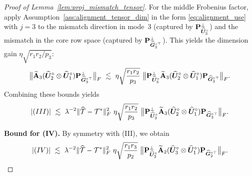 \documentclass[authoryear,preprint,review,12pt]{elsarticle}
\begin{document}
{\begin{proof}[Proof of Lemma~\ref{lem:proj_mismatch_tensor}]
		For the middle Frobenius factor, apply Assumption~\ref{ass:alignment_tensor_dim} in the form \eqref{eq:alignment_use} with $j=3$ to the mismatch direction in mode~3 (captured by
		$\mathbf{P}_{\widehat{\boldsymbol U}_3^\circ}^{\perp}$) and the mismatch in the core row space (captured by
		$\mathbf{P}_{\widehat{\boldsymbol G}_3^{\circ\top}}^{\perp}$). This yields the dimension gain $\eta\sqrt{r_1r_2/p_3}$:
		\begin{equation}\label{eq:III_mid_gain}
			\big\|\widetilde{\mathbf{A}}_3(\widehat{\boldsymbol U}_2^\circ\otimes\widehat{\boldsymbol U}_1^\circ)\mathbf{P}_{\widehat{\boldsymbol G}_3^{\circ\top}}^{\perp}\big\|_F
			\ \lesssim\
			\eta\sqrt{\frac{r_1r_2}{p_3}}\
			\big\|\mathbf{P}_{\widehat{\boldsymbol U}_3^\circ}^{\perp}\widetilde{\mathbf{A}}_3(\widehat{\boldsymbol U}_2^\circ\otimes\widehat{\boldsymbol U}_1^\circ)\mathbf{P}_{\widehat{\boldsymbol G}_3^{\circ\top}}\big\|_F.
		\end{equation}
		Combining these bounds yields
		\begin{equation}\label{eq:III_bound}
			|(III)|
			\ \lesssim\
			\lambda^{-2}\|\widehat{\mathcal{T}}-\mathcal{T}^\ast\|_F^2\
			\eta\sqrt{\frac{r_1r_2}{p_3}}\
			\big\|\mathbf{P}_{\widehat{\boldsymbol U}_3^\circ}^{\perp}\widetilde{\mathbf{A}}_3(\widehat{\boldsymbol U}_2^\circ\otimes\widehat{\boldsymbol U}_1^\circ)\mathbf{P}_{\widehat{\boldsymbol G}_3^{\circ\top}}\big\|_F.
		\end{equation}
		
		\smallskip
		\noindent\textbf{Bound for (IV).}
		By symmetry with (III), we obtain
		\begin{equation}\label{eq:IV_bound}
			|(IV)|
			\ \lesssim\
			\lambda^{-2}\|\widehat{\mathcal{T}}-\mathcal{T}^\ast\|_F^2\
			\eta\sqrt{\frac{r_1r_3}{p_2}}\
			\big\|\mathbf{P}_{\widehat{\boldsymbol U}_2^\circ}^{\perp}\widetilde{\mathbf{A}}_2(\widehat{\boldsymbol U}_3^\circ\otimes\widehat{\boldsymbol U}_1^\circ)\mathbf{P}_{\widehat{\boldsymbol G}_2^{\circ\top}}\big\|_F.
		\end{equation}
		

\end{proof}}
\end{document}
